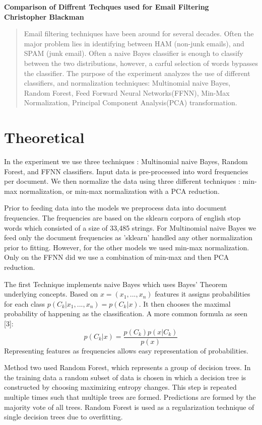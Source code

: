 \documentclass[a4paper,11pt]{article}
\begin{document}
\begin{center}
  \bf{Comparison of Diffrent Techques used for Email Filtering}\\
  \bf{Christopher Blackman}\\
\end{center}
\begin{abstract}
Email filtering techniques have been around for several decades. Often the major problem lies in identifying between HAM (non-junk emails), and SPAM (junk email). Often a naive Bayes classifier is enough to classify between the two distributions, however, a carful selection of words bypasses the classifier. The purpose of the experiment analyzes the use of different classifiers, and normalization techniques: Multinomial naive Bayes, Random Forest, Feed Forward Neural  Networks(FFNN), Min-Max Normalization, Principal Component Analysis(PCA) transformation. 
\end{abstract}

\section*{Theoretical}
In the experiment we use three techniques : Multinomial naive Bayes, Random Forest, and FFNN classifiers. Input data is pre-processed into word frequencies per document. We then normalize the data using three different techniques :  min-max normalization, or min-max normalization with a PCA reduction. 

Prior to feeding data into the models we preprocess data into document frequencies. The frequencies are based on the sklearn corpora of english stop words which consisted of a size of 33,485 strings. For Multinomial naive Bayes we feed only the document frequencies as 'sklearn' handled any other normalization prior to fitting. However, for the other models we used min-max normalization. Only on the FFNN did we use a combination of min-max and then PCA reduction.

The first Technique implements naive Bayes which uses Bayes' Theorem underlying concepts. Based on $x = (x_1,...,x_n)$ features it assigns probabilities for each class $p(C_k | x_1,...,x_n) = p(C_k|x)$. It then chooses the maximal probability of happening as the classification. A more common formula as seen [3]:
$$p(C_k|x) = \frac{p(C_k)p(x|C_k)}{p(x)}$$
Representing features as frequencies allows easy representation of probabilities. 

Method two used Random Forest, which represents a group of decision trees. In the training data a random subset of data is chosen in which a decision tree is constructed by choosing maximizing entropy changes. This step is repeated multiple times such that multiple trees are formed. Predictions are formed by the majority vote of all trees. Random Forest is used as a regularization technique of single decision trees due to overfitting.
\end{document}
